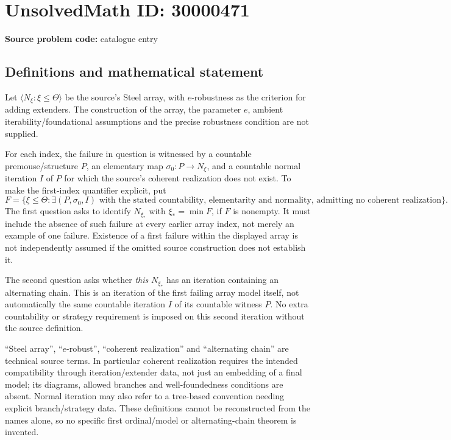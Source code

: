 \documentclass[11pt]{article}
\begin{document}
\section*{UnsolvedMath ID: 30000471}
\textbf{Source problem code:} catalogue entry
\subsection{Definitions and mathematical statement}
Let $\langle N_\xi:\xi\leq\Theta\rangle$ be the source's Steel array, with $e$-robustness as the criterion for adding extenders. The construction of the array, the parameter $e$, ambient iterability/foundational assumptions and the precise robustness condition are not supplied.

For each index, the failure in question is witnessed by a countable premouse/structure $P$, an elementary map $\sigma_0:P\to N_\xi$, and a countable normal iteration $I$ of $P$ for which the source's coherent realization does not exist. To make the first-index quantifier explicit, put
\[
 F=\{\xi\leq\Theta:\exists(P,\sigma_0,I)
 \text{ with the stated countability, elementarity and normality,}
 \text{ admitting no coherent realization}\}.
\]
The first question asks to identify $N_{\xi_*}$ with $\xi_*=\min F$, if $F$ is nonempty. It must include the absence of such failure at every earlier array index, not merely an example of one failure. Existence of a first failure within the displayed array is not independently assumed if the omitted source construction does not establish it.

The second question asks whether \emph{this} $N_{\xi_*}$ has an iteration containing an alternating chain. This is an iteration of the first failing array model itself, not automatically the same countable iteration $I$ of its countable witness $P$. No extra countability or strategy requirement is imposed on this second iteration without the source definition.

``Steel array'', ``$e$-robust'', ``coherent realization'' and ``alternating chain'' are technical source terms. In particular coherent realization requires the intended compatibility through iteration/extender data, not just an embedding of a final model; its diagrams, allowed branches and well-foundedness conditions are absent. Normal iteration may also refer to a tree-based convention needing explicit branch/strategy data. These definitions cannot be reconstructed from the names alone, so no specific first ordinal/model or alternating-chain theorem is invented.
\end{document}
